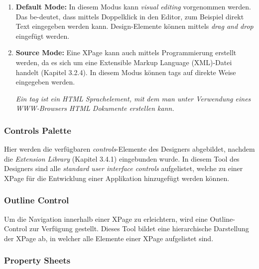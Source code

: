 \begin{enumerate}
\item \textbf{Default Mode:} In diesem Modus kann \textit{visual editing} vorgenommen werden. Das be-\linebreak deutet, dass mittels Doppelklick in den
 Editor,  
zum Beispiel direkt Text eingegeben \linebreak werden kann. Design-Elemente können mittels \textit{drag and drop} eingefügt werden. 
\item \textbf{Source Mode:} Eine XPage kann auch mittels Programmierung erstellt werden, da es sich um eine Extensible Markup Language (XML)-Datei 
handelt (Kapitel 3.2.4). 
In \linebreak diesem Modus können tags auf direkte Weise  eingegeben werden.\newline
\newline
\begin{graybox}
 \textit{Ein tag ist ein HTML Sprachelement, mit dem man unter Verwendung eines WWW-Browsers HTML Dokumente erstellen kann\cite{tag}. }
 \end{graybox} 
\end{enumerate}

\subsubsection{Controls Palette}
\label{sec:4designelemente}

Hier werden die verfügbaren \textit{controls}-Elemente des Designers abgebildet, nachdem die \textit{Extension Library} (Kapitel 3.4.1) eingebunden wurde.
In diesem Tool des Designers sind alle \textit{standard user interface controls} aufgelistet, welche zu einer XPage für die Entwicklung einer Applikation
hinzugefügt werden können.

\subsubsection{Outline Control}
\label{sec:4designelemente}

Um die Navigation innerhalb einer XPage zu erleichtern, wird eine Outline-Control zur \linebreak Verfügung gestellt.
Dieses Tool bildet eine hierarchische Darstellung der XPage ab, in welcher alle Elemente einer XPage aufgelistet sind.


\subsubsection{Property Sheets}
\label{sec:4designelemente}

